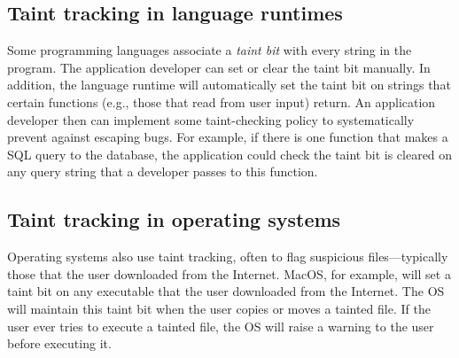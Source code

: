 \subsection{Taint tracking in language runtimes}
Some programming languages associate a \emph{taint bit} with every string
in the program.
The application developer can set or clear the taint bit manually.
In addition, the language runtime will automatically set the taint
bit on strings that certain functions (e.g., those that read from
user input) return.
An application developer then can implement some taint-checking policy
to systematically prevent against escaping bugs.
For example, if there is one function that makes a SQL query to the database,
the application could check the taint bit is cleared on any query string that
a developer passes to this function.


\subsection{Taint tracking in operating systems}
Operating systems also use taint tracking, often to flag 
suspicious files---typically those that the user downloaded
from the Internet.
MacOS, for example, will set a taint bit on any executable that
the user downloaded from the Internet.
The OS will maintain this taint bit when the user copies or moves
a tainted file.
If the user ever tries to execute a tainted file, the OS will
raise a warning to the user before executing it. 


